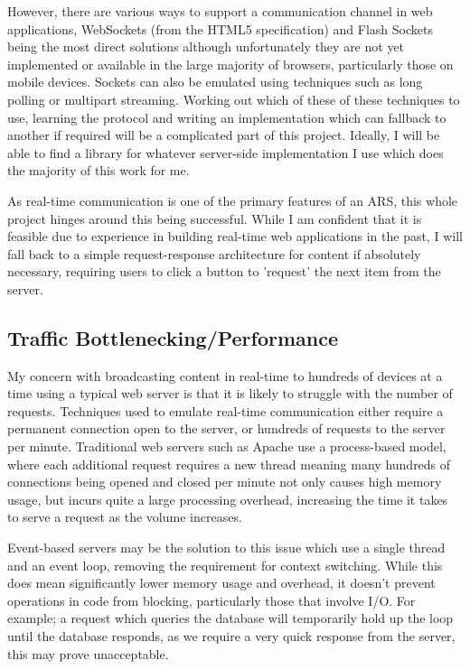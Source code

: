 \documentclass[a4papert,11pt,notitlepage]{ltxdoc}
\begin{document}
However, there are various ways to support a  communication channel in web applications, WebSockets (from the HTML5 specification) and Flash Sockets being the most direct solutions although unfortunately they are not yet implemented or available in the large majority of browsers, particularly those on mobile devices. Sockets can also be emulated using techniques such as long polling or multipart streaming. Working out which of these of these techniques to use, learning the protocol and writing an implementation which can fallback to another if required will be a complicated part of this project. Ideally, I will be able to find a library for whatever server-side implementation I use which does the majority of this work for me.

As real-time communication is one of the primary features of an ARS, this whole project hinges around this being successful. While I am confident that it is feasible due to experience in building real-time web applications in the past, I will fall back to a simple request-response architecture for content if absolutely necessary, requiring users to click a button to 'request' the next item from the server.

\subsection{Traffic Bottlenecking/Performance}
My concern with broadcasting content in real-time to hundreds of devices at a time using a typical web server is that it is likely to struggle with the number of requests. Techniques used to emulate real-time communication either require a permanent connection open to the server, or hundreds of requests to the server per minute. Traditional web servers such as Apache use a process-based model, where each additional request requires a new thread meaning many hundreds of connections being opened and closed per minute not only causes high memory usage, but incurs quite a large processing overhead, increasing the time it takes to serve a request as the volume increases.

Event-based servers may be the solution to this issue which use a single thread and an event loop, removing the requirement for context switching. While this does mean significantly lower memory usage and overhead, it doesn't prevent operations in code from blocking, particularly those that involve I/O. For example; a request which queries the database will temporarily hold up the loop until the database responds, as we require a very quick response from the server, this may prove unacceptable.
\end{document}
